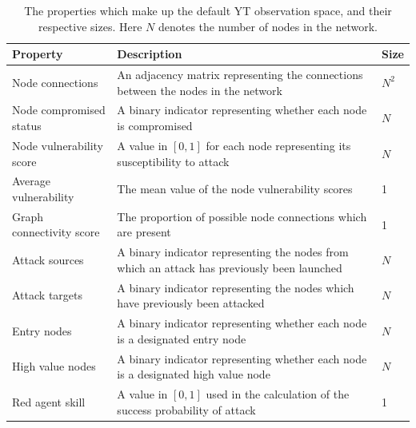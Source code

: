 \documentclass{article}
\begin{document}
\begin{table}[h!]
    \centering
    \small
    \begin{tabular}{ | m{} | m{}| m{}|} 
      \hline
       \textbf{Property} & \textbf{Description} & \textbf{Size}\\ 
      \hline
         Node connections & An adjacency matrix representing the connections between the nodes in the network & $N^2$ \\ 
      \hline
         Node compromised status & A binary indicator representing whether each node is compromised & $N$ \\ 
      \hline
         Node vulnerability score & A value in $[0,1]$ for each node representing its susceptibility to attack & $N$ \\
      \hline
         Average vulnerability & The mean value of the node vulnerability scores & 1 \\ 
      \hline    
         Graph connectivity score & The proportion of possible node connections which are present & 1 \\ 
      \hline
         Attack sources & A binary indicator representing the nodes from which an attack has previously been launched & $N$ \\ 
      \hline
         Attack targets & A binary indicator representing the nodes which have previously been attacked & $N$ \\ 
      \hline
         Entry nodes & A binary indicator representing whether each node is a designated entry node & $N$ \\ 
      \hline
         High value nodes & A binary indicator representing whether each node is a designated high value node & $N$ \\ 
      \hline
         Red agent skill & A value in $[0,1]$ used in the calculation of the success probability of attack & 1 \\ 
      \hline
      
    \end{tabular}
    \caption{The properties which make up the default YT observation space, and their respective sizes. Here $N$ denotes the number of nodes in the network.}
    \label{tab: obs space}
\end{table}
\end{document}
